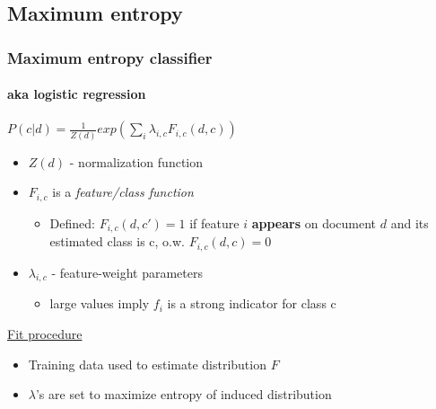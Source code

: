 \documentclass{beamer}
\begin{document}
\subsection{Maximum entropy}
\begin{frame}
	\frametitle{Maximum entropy classifier}
	\framesubtitle{aka logistic regression}
	\begin{Definition}
		$P(c|d) = \frac{1}{Z(d)} exp(\sum_{i}\lambda_{i,c}F_{i,c}(d,c))$
	\end{Definition}
	\begin{itemize}
		\pause
		\item $Z(d)$ - normalization function
		\pause
		\item $F_{i,c}$ is a \emph{feature/class function}\
		\pause
		\begin{itemize}
			\item Defined: $F_{i,c}(d,c') = 1$ if feature $i$ \textbf{appears} on document $d$ and its estimated class is c, o.w. $F_{i,c}(d,c) = 0$
		\end{itemize}
		\pause
		\item $\lambda_{i,c}$ - feature-weight parameters 
		\begin{itemize}
			\item large values imply $f_i$ is a strong indicator for class c
		\end{itemize}

	\end{itemize}
	
	\pause
	\underline{Fit procedure}
	\begin{itemize}
		\item Training data used to estimate distribution $F$
		\item $\lambda$'s are set to maximize entropy of induced distribution
	\end{itemize}
			
\end{frame}
\end{document}
